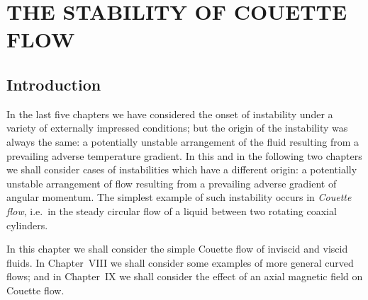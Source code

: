 
\chapter{THE STABILITY OF COUETTE FLOW}
\label{ch:7}

\section{Introduction}\label{sec:7-64}
In the last five chapters we have considered the onset of instability
under a variety of externally impressed conditions; but the origin of the
instability was always the same: a potentially unstable arrangement of
the fluid resulting from a prevailing adverse temperature gradient.  In this
and in the following two chapters we shall consider cases of instabilities
which have a different origin: a potentially unstable arrangement of flow
resulting from a prevailing adverse gradient of angular momentum.  The
simplest example of such instability occurs in \emph{Couette flow}, i.e.\ in the
steady circular flow of a liquid between two rotating coaxial cylinders.

In this chapter we shall consider the simple Couette flow of inviscid
and viscid fluids.  In Chapter~VIII we shall consider some examples of
more general curved flows; and in Chapter~IX we shall consider the
effect of an axial magnetic field on Couette flow.


